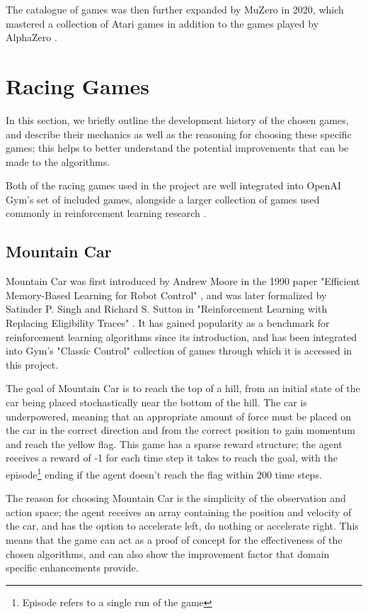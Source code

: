 The catalogue of games was then further expanded by MuZero in 2020, which
mastered a collection of Atari games in addition to the games played by
AlphaZero \cite{schrittwieser2020mastering}.



\section{Racing Games}
In this section, we briefly outline the development history of the chosen
games, and describe their mechanics as well as the reasoning for choosing these
specific games; this helps to better understand the potential improvements that
can be made to the algorithms.

Both of the racing games used in the project are well integrated into OpenAI
Gym's set of included games, alongside a larger collection of games used
commonly in reinforcement learning research \cite{brockman2016gym}.

\subsection{Mountain Car} \label{sec:mountain_car_background}
Mountain Car was first introduced by Andrew Moore in the 1990 paper "Efficient
Memory-Based Learning for Robot Control" \cite{moore1990efficient}, and was
later formalized by Satinder P. Singh and Richard S. Sutton in "Reinforcement
Learning with Replacing Eligibility Traces" \cite{singh1996reinforcement}. It
has gained popularity as a benchmark for reinforcement learning algorithms
since its introduction, and has been integrated into Gym's "Classic Control"
collection of games \cite{brockman2016gym} through which it is accessed in this
project.

The goal of Mountain Car is to reach the top of a hill, from an initial state
of the car being placed stochastically near the bottom of the hill. The car is
underpowered, meaning that an appropriate amount of force must be placed on the
car in the correct direction and from the correct position to gain momentum and
reach the yellow flag. This game has a sparse reward structure; the agent
receives a reward of -1 for each time step it takes to reach the goal, with the
episode\footnote{Episode refers to a single run of the game} ending if the
agent doesn't reach the flag within 200 time steps.

The reason for choosing Mountain Car is the simplicity of the observation and
action space; the agent receives an array containing the position and velocity
of the car, and has the option to accelerate left, do nothing or accelerate
right. This means that the game can act as a proof of concept for the
effectiveness of the chosen algorithms, and can also show the improvement
factor that domain specific enhancements provide.

